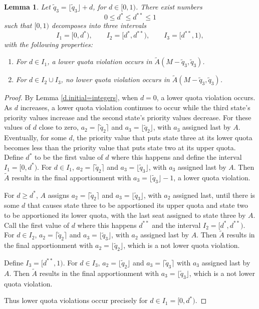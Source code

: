 \documentclass[11pt]{article}
\newtheorem{lemma}[theorem]{Lemma}
\theoremstyle{definition}
\theoremstyle{definition}
\begin{document}
\begin{lemma}\label{d.intervals} Let $\tilde{q}_3 = \lfloor \tilde{q}_3 \rfloor + d$, for $d\in [0,1)$. 
There exist numbers
$$
0 \le d^* \le d^{**} \le 1
$$
such that $[0,1)$ decomposes into three intervals
$$I_1 = [0,d^*), \qquad I_2 = [d^*,d^{**}),\qquad I_3 = [d^{**},1),$$
with the following properties:

\begin{enumerate}
\item For $d \in I_1$, a lower quota violation occurs in $\tilde{A}(M-\tilde{q}_3, \tilde{q}_3)$.
\item For $d \in I_2 \cup I_3$, no lower quota violation occurs in $\tilde{A}(M-\tilde{q}_3, \tilde{q}_3)$.
\end{enumerate}
\end{lemma}

\begin{proof}
By Lemma \ref{d.initial=integers}, when $d=0$, a lower quota violation occurs. As $d$ increases, a lower quota violation continues to occur while the third state's priority values increase and the second state's priority values decrease. For these values of $d$ close to zero, $a_2 = \lceil\tilde{q}_2 \rceil$ and $a_3 = \lfloor \tilde{q}_2 \rfloor $, with $a_3$ assigned last by $A$. Eventually, for some $d$, the priority value that puts state three at its lower quota becomes less than the priority value that puts state two at its upper quota. Define $d^*$ to be the first value of $d$ where this happens and define the interval $I_1 = [0,d^*)$. For $d \in I_1$, $a_2 = \lceil\tilde{q}_2 \rceil$ and $a_3 = \lfloor \tilde{q}_3 \rfloor $, with $a_3$ assigned last by $A$. Then $\tilde{A}$ results in the final apportionment with $a_3= \lfloor \tilde{q}_3 \rfloor-1$, a lower quota violation. 


For $d\geq d^*$, $A$ assigns $a_2 = \lceil\tilde{q}_2 \rceil$ and $a_3 = \lfloor \tilde{q}_3 \rfloor $, with $a_2$ assigned last, until there is some $d$ that causes state three to be apportioned its upper quota and state two to be apportioned its lower quota, with the last seat assigned to state three by $A$. Call the first value of $d$ where this happens $d^{**}$ and the interval $I_2 = [d^*,d^{**})$. For $d \in I_2$, $a_2 = \lceil \tilde{q}_2 \rceil$ and $a_3 = \lfloor \tilde{q}_3 \rfloor$, with $a_2$ assigned last by $A$. Then $\tilde{A}$ results in the final apportionment with $a_2=\lfloor \tilde{q}_2 \rfloor$, which is a not lower quota violation. %

Define $I_3 = [d^{**},1).$ For $d \in I_3$, $a_2 = \lfloor \tilde{q}_2 \rfloor$ and $a_3 = \lceil \tilde{q}_3 \rceil$ with $a_3$ assigned last by $A$. Then $\tilde{A}$ results in the final apportionment with $a_3= \lfloor \tilde{q}_3 \rfloor$, which is a not lower quota violation. %

Thus lower quota violations occur precisely for $d \in I_1=[0,d^*)$.
\end{proof}
\end{document}
